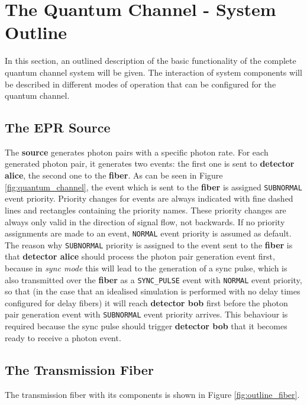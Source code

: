 \section{The Quantum Channel - System Outline}
\label{sec:outline}

In this section, an outlined description of the basic functionality of the complete quantum channel system will be given. The interaction of system components will be described in different modes of operation that can be configured for the quantum channel.

\subsection{The EPR Source}
\label{subsec:outline_source}

The \textbf{source} generates photon pairs with a specific photon rate. For each generated photon pair, it generates two events: the first one is sent to \textbf{detector alice}, the second one to the \textbf{fiber}. As can be seen in Figure \ref{fig:quantum_channel}, the event which is sent to the \textbf{fiber} is assigned \texttt{SUBNORMAL} event priority. Priority changes for events are always indicated with fine dashed lines and rectangles containing the priority names. These priority changes are always only valid in the direction of signal flow, not backwards. If no priority assignments are made to an event, \texttt{NORMAL} event priority is assumed as default.
The reason why \texttt{SUBNORMAL} priority is assigned to the event sent to the \textbf{fiber} is that \textbf{detector alice} should process the photon pair generation event first, because in \textit{sync mode} this will lead to the generation of a sync pulse, which is also transmitted over the \textbf{fiber} as a \texttt{SYNC\_PULSE} event with \texttt{NORMAL} event priority, so that (in the case that an idealised simulation is performed with no delay times configured for delay fibers) it will reach \textbf{detector bob} first before the photon pair generation event with \texttt{SUBNORMAL} event priority arrives. This behaviour is required because the sync pulse should trigger \textbf{detector bob} that it becomes ready to receive a photon event.

\subsection{The Transmission Fiber}
\label{subsec:outline_fiber}

The transmission fiber with its components is shown in Figure \ref{fig:outline_fiber}. 

